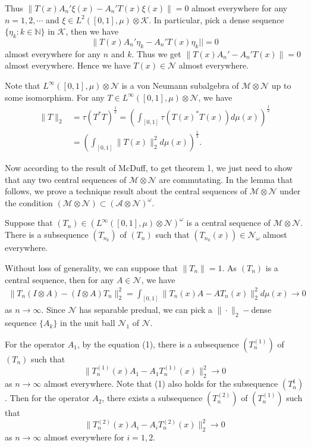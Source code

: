 \documentclass[12pt]{article}
\begin{document}
Thus $\|T(x)A_{n}'\xi(x)-A_{n}'T(x)\xi(x)\|=0$ almost everywhere for any $n=1,2,\cdots$ and
$\xi\in L^{2}([0,1],\mu)\otimes\mathcal{K}$. In particular, pick a
dense sequence $\{\eta_{k}:k\in\mathbb{N}\}$ in $\mathcal{K}$, then we have
$$\|T(x)A_{n}'\eta_{k}-A_{n}'T(x)\eta_{k}||=0$$
almost everywhere for any $n$ and $k$. Thus we get $\|T(x)A_{n}'-A_{n}'T(x)\|=0$ almost everywhere.
Hence we have $T(x)\in\mathcal{N}$ almost everywhere.
\endproof
\vskip6pt

 Note that
$L^{\infty}([0,1],\mu)\otimes\mathcal{N}$ is a von Neumann
subalgebra of $\mathcal{M}\otimes\mathcal{N}$ up to some
isomorphism. For any $T\in L^{\infty}([0,1],\mu)\otimes\mathcal{N}$,
we have
\begin{align*}\|T\|_{2}&=\tau(T^{*}T)^{\frac{1}{2}}=(\int_{[0,1]}\tau(T(x)^{*}T(x))d\mu(x))^{\frac{1}{2}}\\
&=(\int_{[0,1]}\|T(x)\|^{2}_{2}d\mu(x))^{\frac{1}{2}}.
\end{align*}

Now according to the result of McDuff, to get theorem 1, we just
need to show that any two central sequences of
$\mathcal{M}\otimes\mathcal{N}$ are commutating. In the lemma that
follows, we prove a technique result about the central sequences of
$\mathcal{M}\otimes\mathcal{N}$ under the condition
$(\mathcal{M}\otimes\mathcal{N})\subset(\mathcal{A}\otimes\mathcal{N})^{\omega}$.

\vskip6pt

 Suppose that
$(T_{n})\in(L^{\infty}([0,1],\mu)\otimes\mathcal{N})^{\omega}$ is a
central sequence of $\mathcal{M}\otimes\mathcal{N}$. There is a
subsequence $(T_{n_{k}})$ of $(T_{n})$ such that
$(T_{n_{k}}(x))\in\mathcal{N}_{\omega}$ almost everywhere. \vskip6pt

 Without loss of generality, we can suppose
that $\|T_{n}\|=1$. As $(T_{n})$ is a central sequence, then for any
$A\in\mathcal{N}$, we have
\begin{align}\|T_{n}(I\otimes A)-(I\otimes A)T_{n}\|_{2}^{2}=\int_{[0,1]}\|T_{n}(x)A-AT_{n}(x)\|^{2}_{2}d\mu(x)\rightarrow0
\end{align}
as $n\rightarrow\infty$. Since $\mathcal{N}$ has separable predual,
we can pick a $\|\cdot\|_{2}-$dense sequence $\{A_{k}\}$ in the unit ball $\mathcal{N}_{1}$ of $\mathcal{N}$.

For the operator $A_{1}$, by the equation (1), there is a
subsequence $(T_{n}^{(1)})$ of $(T_{n})$ such that
$$\|T_{n}^{(1)}(x)A_{1}-A_{1}T_{n}^{(1)}(x)\|^{2}_{2}\rightarrow0$$
as $n\rightarrow\infty$ almost everywhere. Note that (1) also holds
for the subsequence $(T_{n}^{1})$. Then for the operator $A_{2}$,
 there exists a subsequence $(T_{n}^{(2)})$ of $(T_{n}^{(1)})$ such that
$$\|T_{n}^{(2)}(x)A_{i}-A_{i}T_{n}^{(2)}(x)\|^{2}_{2}\rightarrow0$$
as $n\rightarrow\infty$ almost everywhere for $i=1,2$.
\end{document}
